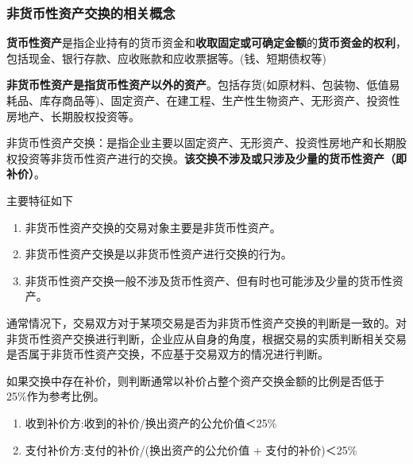 \documentclass[UTF8,12pt]{ctexart}
\numberwithin{equation}{section} %
\numberwithin{figure}{section}
\numberwithin{table}{section}
\begin{document}
	\subsubsection{非货币性资产交换的相关概念}
	\textbf{货币性资产}是指企业持有的货币资金和\textbf{收取固定或可确定金额}的\textbf{货币资金的权利}，包括现金、银行存款、应收账款和应收票据等。(钱、短期债权等)
	
	\textbf{非货币性资产是指货币性资产以外的资产}。包括存货(如原材料、包装物、低值易耗品、库存商品等)、固定资产、在建工程、生产性生物资产、无形资产、投资性房地产、长期股权投资等。
	
	非货币性资产交换：是指企业主要以固定资产、无形资产、投资性房地产和长期股权投资等非货币性资产进行的交换。\textbf{该交换不涉及或只涉及少量的货币性资产（即补价）}。
	
	主要特征如下
	\begin{enumerate}
		\item 非货币性资产交换的交易对象主要是非货币性资产。
		
		\item 非货币性资产交换是以非货币性资产进行交换的行为。
		
		\item 非货币性资产交换一般不涉及货币性资产、但有时也可能涉及少量的货币性资产。
		
 	\end{enumerate}
	
	通常情况下，交易双方对于某项交易是否为非货币性资产交换的判断是一致的。对非货币性资产交换进行判断，企业应从自身的角度，根据交易的实质判断相关交易是否属于非货币性资产交换，不应基于交易双方的情况进行判断。
	
	如果交换中存在补价，则判断通常以补价占整个资产交换金额的比例是否低于 25\%作为参考比例。
	\begin{enumerate}
		\item 收到补价方:收到的补价/换出资产的公允价值＜25\%
		
		\item 支付补价方:支付的补价/(换出资产的公允价值 + 支付的补价)＜25\%
	\end{enumerate}
	
\end{document}
